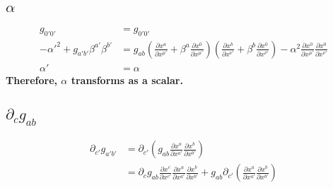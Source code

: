 \documentclass{article}
\begin{document}
\subsection{$\alpha$}
\begin{align*}
g_{0'0'} & = g_{0'0'}\\
-\alpha'^{2} + g_{a'b'}\beta^{a'}\beta^{b'} & = g_{ab}(\frac{\partial x^{a}}{\partial x^{\mu '}} + \beta^{a}\frac{\partial x^{0}}{\partial x^{\mu '}})(\frac{\partial x^{b}}{\partial x^{\nu '}} + \beta^{b}\frac{\partial x^{0}}{\partial x^{\nu '}}) - \alpha^2\frac{\partial x^{0}}{\partial x^{\mu '}}\frac{\partial x^{0}}{\partial x^{\nu '}}\\
\alpha' & = \alpha
\end{align*}
{\bf {\color{red}Therefore, $\alpha$ transforms as a scalar.}} 
\subsection{$\partial_{c}g_{ab}$}
\begin{align*}
\partial_{c'}g_{a'b'} & = \partial_{c'}(g_{ab}\frac{\partial x^{a}}{\partial x^{a'}}\frac{\partial x^{b}}{\partial x^{b'}})\\
& = \partial_{c}g_{ab}\frac{\partial x^{c}}{\partial x^{c'}}\frac{\partial x^{a}}{\partial x^{a'}}\frac{\partial x^{b}}{\partial x^{b'}} + g_{ab}\partial_{c'}(\frac{\partial x^{a}}{\partial x^{a'}}\frac{\partial x^{b}}{\partial x^{b'}})
\end{align*}
\end{document}
